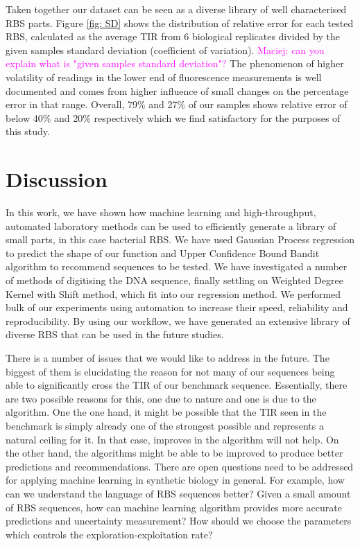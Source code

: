 \documentclass{article}
\newcommand{\mengyan}[1]{\textcolor{magenta}{#1}}
\begin{document}
Taken together our dataset can be seen as a diverse library of well characterised RBS parts.
Figure \ref{fig: SD} shows the distribution of relative error for each tested RBS, calculated as the average TIR from 6 biological replicates divided by the given samples standard deviation (coefficient of variation).
\mengyan{Maciej: can you explain what is "given samples standard deviation"?}
The phenomenon of higher volatility of readings in the lower end of fluorescence measurements is well documented and comes from higher influence of small changes on the percentage error in that range.
Overall, 79\% and 27\% of our samples shows relative error of below 40\% and 20\% respectively which we find satisfactory for the purposes of this study.

\section{Discussion}

In this work, we have shown how machine learning and high-throughput, automated laboratory methods can be used to efficiently generate a library of small parts, in this case bacterial RBS. 
We have used Gaussian Process regression to predict the shape of our function and Upper Confidence Bound Bandit algorithm to recommend sequences to be tested.
We have investigated a number of methods of digitising the DNA sequence, finally settling on Weighted Degree Kernel with Shift method, which fit into our regression method.
We performed bulk of our experiments using automation to increase their speed, reliability and reproducibility.
By using our workflow, we have generated an extensive library of diverse RBS that can be used in the future studies.

There is a number of issues that we would like to address in the future.
The biggest of them is elucidating the reason for not many of our sequences being able to significantly cross the TIR of our benchmark sequence.
Essentially, there are two possible reasons for this, one due to nature and one is due to the algorithm.
One the one hand, it might be possible that the TIR seen in the benchmark is simply already one of the strongest possible and represents a natural ceiling for it. 
In that case, improves in the algorithm will not help.
On the other hand, the algorithms might be able to be improved to produce better predictions and recommendations. 
There are open questions need to be addressed for applying machine learning in synthetic biology in general.
For example, 
how can we understand the language of RBS sequences better?
Given a small amount of RBS sequences, how can machine learning algorithm provides more accurate predictions and uncertainty measurement? 
How should we choose the parameters which controls the exploration-exploitation rate? 
\end{document}
